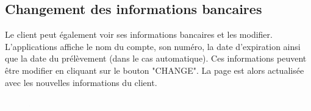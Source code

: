 \subsection{Changement des informations bancaires}
\begin{flushleft}
Le client peut également voir ses informations bancaires et les modifier. L'applications affiche le nom du compte, son numéro, la date d'expiration ainsi que la date du prélèvement (dans le cas automatique). Ces informations peuvent être modifier en cliquant sur le bouton "CHANGE". La page est alors actualisée avec les nouvelles informations du client.
\end{flushleft}
\begin{figure}[h]
\centering
\includegraphics[width = 1]{extension-maxime/interface/img/paiement-informations.png}
\end{figure}
